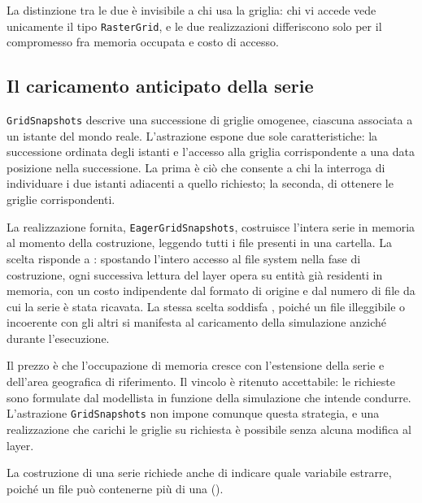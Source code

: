 La distinzione tra le due è invisibile a chi usa la griglia:
chi vi accede vede unicamente il tipo \texttt{RasterGrid}, e le due realizzazioni
differiscono solo per il compromesso fra memoria occupata e costo di accesso.

\subsection{Il caricamento anticipato della serie}
\label{subsec:grid-snapshots}

\texttt{GridSnapshots} descrive una successione di griglie omogenee, ciascuna associata a
un istante del mondo reale. L'astrazione espone due sole caratteristiche: la successione
ordinata degli istanti e l'accesso alla griglia corrispondente a una data posizione nella
successione. La prima è ciò che consente a chi la interroga di individuare i due istanti
adiacenti a quello richiesto; la seconda, di ottenere le griglie corrispondenti.

La realizzazione fornita, \texttt{EagerGridSnapshots}, costruisce l'intera serie in memoria
al momento della costruzione, leggendo tutti i file presenti in una cartella. La scelta
risponde a : spostando l'intero accesso al file system nella fase di costruzione,
ogni successiva lettura del layer opera su entità già residenti in memoria, con un costo
indipendente dal formato di origine e dal numero di file da cui la serie è stata ricavata.
La stessa scelta soddisfa , poiché un file illeggibile o incoerente con gli
altri si manifesta al caricamento della simulazione anziché durante l'esecuzione.

Il prezzo è che l'occupazione di memoria cresce con l'estensione della serie e dell'area
geografica di riferimento. Il vincolo è ritenuto accettabile: le richieste sono formulate
dal modellista in funzione della simulazione che intende condurre. L'astrazione
\texttt{GridSnapshots} non impone comunque questa strategia, e una realizzazione che
carichi le griglie su richiesta è possibile senza alcuna modifica al layer.

La costruzione di una serie richiede anche di indicare quale variabile estrarre, poiché un file
può contenerne più di una ().

